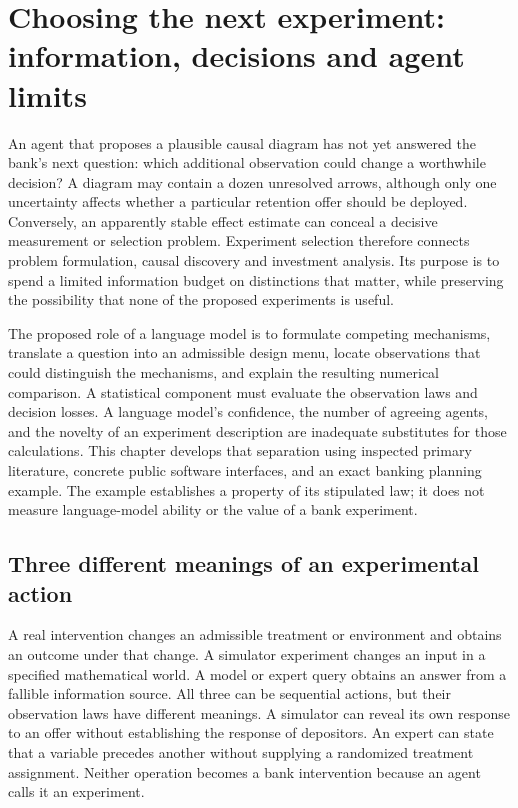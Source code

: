\chapter{Choosing the next experiment: information, decisions and agent limits}
\label{exec13:active-experiments}

An agent that proposes a plausible causal diagram has not yet answered the
bank's next question: which additional observation could change a worthwhile
decision? A diagram may contain a dozen unresolved arrows, although only one
uncertainty affects whether a particular retention offer should be deployed.
Conversely, an apparently stable effect estimate can conceal a decisive
measurement or selection problem. Experiment selection therefore connects
problem formulation, causal discovery and investment analysis. Its purpose is
to spend a limited information budget on distinctions that matter, while
preserving the possibility that none of the proposed experiments is useful.

The proposed role of a language model is to formulate competing mechanisms,
translate a question into an admissible design menu, locate observations that
could distinguish the mechanisms, and explain the resulting numerical
comparison. A statistical component must evaluate the observation laws and
decision losses. A language model's confidence, the number of agreeing agents,
and the novelty of an experiment description are inadequate substitutes for
those calculations. This chapter develops that separation using inspected
primary literature, concrete public software interfaces, and an exact banking
planning example. The example establishes a property of its stipulated law;
it does not measure language-model ability or the value of a bank experiment.

\section{Three different meanings of an experimental action}

A real intervention changes an admissible treatment or environment and obtains
an outcome under that change. A simulator experiment changes an input in a
specified mathematical world. A model or expert query obtains an answer from
a fallible information source. All three can be sequential actions, but their
observation laws have different meanings. A simulator can reveal its own
response to an offer without establishing the response of depositors. An
expert can state that a variable precedes another without supplying a
randomized treatment assignment. Neither operation becomes a bank intervention
because an agent calls it an experiment.

